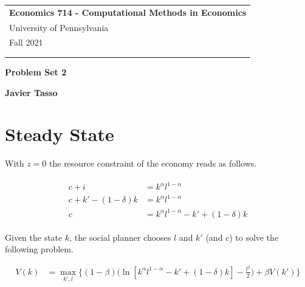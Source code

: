 \documentclass[a4paper,12pt]{article}
\begin{document}
\begin{tabular}{p{15.5cm}} 
{\large \bf Economics 714 - Computational Methods in Economics} \\
University of Pennsylvania \\ Fall 2021 \\ \\ 
\hline 
\\
\end{tabular} 

\vspace*{0.3cm} 

\begin{center} 
	{\Large \bf Problem Set 2} 
	\vspace{2mm}
	
        
	{\bf Javier Tasso} 
		
\end{center}  

\vspace{0.4cm}




    
     
    \section{Steady State} 
    \medskip
    
    With $z=0$ the resource constraint of the economy reads as follows. 
    
    \begin{align} \label{consumption_equation}\begin{split}
        c + i & = k^{\alpha}  l^{1-\alpha} \\ c + k' - (1-\delta) k & = k^{\alpha}  l^{1-\alpha} \\ c & = k^{\alpha}  l^{1-\alpha}  - k' + (1-\delta) k \end{split}
    \end{align}
    
    Given the state $k$, the social planner chooses $l$ and $k'$ (and $c$) to solve the following problem. 
    
    \begin{align*}
        V(k) & = \max_{k',l} \bigg\{(1-\beta)\bigg(\ln[k^{\alpha}  l^{1-\alpha}  - k' + (1-\delta) k] -\frac{l^2}{2}\bigg) + \beta V(k')\bigg\}
    \end{align*}
    
\end{document}
